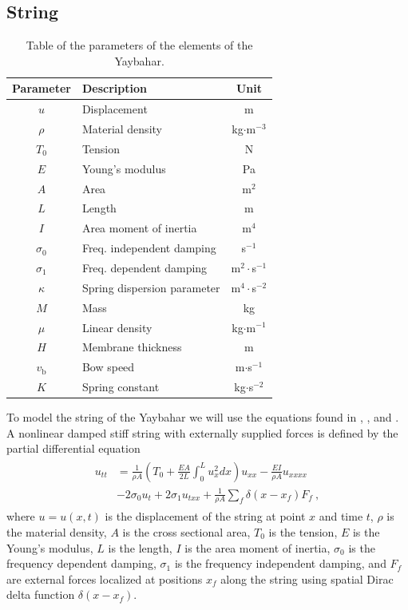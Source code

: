 \documentclass{article}
\begin{document}
\subsection{String}
\label{sec:string}

\begin{table}[h]
\centering
\begin{tabularx}{\linewidth}{c | l | c}
  Parameter & Description & Unit \\
  \hline
  $u$ & Displacement & m \\
  $\rho$ & Material density & kg$\cdot$m$^{-3}$ \\
  $T_0$ & Tension & N \\
  $E$ & Young's modulus & Pa \\
  $A$ & Area & m$^2$ \\
  $L$ & Length & m \\
  $I$ & Area moment of inertia & m$^4$\\
  $\sigma_0$ & Freq. independent damping & s$^{-1}$\\
  $\sigma_1$ & Freq. dependent damping & m$^2 \cdot$s$^{-1}$ \\
  $\kappa$ & Spring dispersion parameter & m$^4\cdot$s$^{-2}$\\
  $M$ & Mass & kg \\
  $\mu$ & Linear density & kg$\cdot$m$^{-1}$ \\
  $H$ & Membrane thickness & m \\
  $v_\text{b}$ & Bow speed & m$\cdot$s$^{-1}$ \\
  $K$ & Spring constant & kg$\cdot$s$^{-2}$
\end{tabularx}
\label{table:stringParamters}
\caption{Table of the parameters of the elements of the Yaybahar.}
\end{table}

To model the string of the Yaybahar we will use the equations found in \cite[Chapters~6,7, and 8] {bilbao_numerical_2009}, \cite{bilbao_modular_2009}, and \cite{bensa_simulation_2003}.
A nonlinear damped stiff string with externally supplied forces is defined by the partial differential equation
\begin{align}
  \begin{split}
  u_{tt} &= \frac{1}{\rho A} \left(T_0 + \frac{E A}{2L} \int_0^L u_x^2 dx \right)u_{xx} - \frac{E I}{\rho A} u_{xxxx}\\
  &- 2 \sigma_0 u_t + 2 \sigma_1 u_{txx} + \frac{1}{\rho A}\sum_f\delta(x-x_f)F_f\ ,
  \end{split}
  \label{eq:stiffNonlinearString}
\end{align}
where $u = u(x, t)$ is the displacement of the string at point $x$ and time $t$, $\rho$ is the material density, $A$ is the cross sectional area, $T_0$ is the tension, $E$ is the Young's modulus, $L$ is the length, $I$ is the area moment of inertia, $\sigma_0$ is the frequency dependent damping, $\sigma_1$ is the frequency independent damping, and $F_f$ are external forces localized at positions $x_f$ along the string using spatial Dirac delta function $\delta(x-x_f)$.
\end{document}
